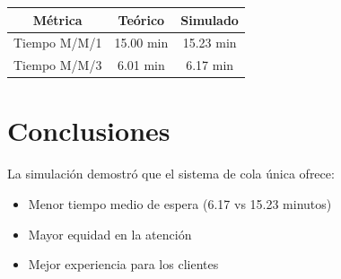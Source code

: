 \documentclass{article}
\begin{document}
\begin{tabular}{|c|c|c|}
\hline
\textbf{Métrica} & \textbf{Teórico} & \textbf{Simulado} \\ \hline
Tiempo M/M/1 & 15.00 min & 15.23 min \\ \hline
Tiempo M/M/3 & 6.01 min & 6.17 min \\ \hline
\end{tabular}

\newpage

\section{Conclusiones}\label{sec:conclusiones}
La simulación demostró que el sistema de cola única ofrece:
\begin{itemize}
\item Menor tiempo medio de espera (6.17 vs 15.23 minutos)
\item Mayor equidad en la atención
\item Mejor experiencia para los clientes
\end{itemize}
\end{document}
